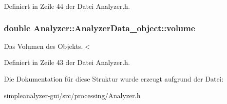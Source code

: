 Definiert in Zeile 44 der Datei Analyzer.\-h.

\hypertarget{structAnalyzer_1_1AnalyzerData__object_a78ddeb311ff702e110fc1d483d826920}{
\subsubsection[{volume}]{\setlength{\rightskip}{0pt plus 5cm}double Analyzer\-::\-Analyzer\-Data\-\_\-object\-::volume}}\label{structAnalyzer_1_1AnalyzerData__object_a78ddeb311ff702e110fc1d483d826920}
Das Volumen des Objekts.$<$ 

Definiert in Zeile 43 der Datei Analyzer.\-h.



Die Dokumentation für diese Struktur wurde erzeugt aufgrund der Datei\-:\begin{DoxyCompactItemize}
\item 
simpleanalyzer-\/gui/src/processing/Analyzer.\-h\end{DoxyCompactItemize}
